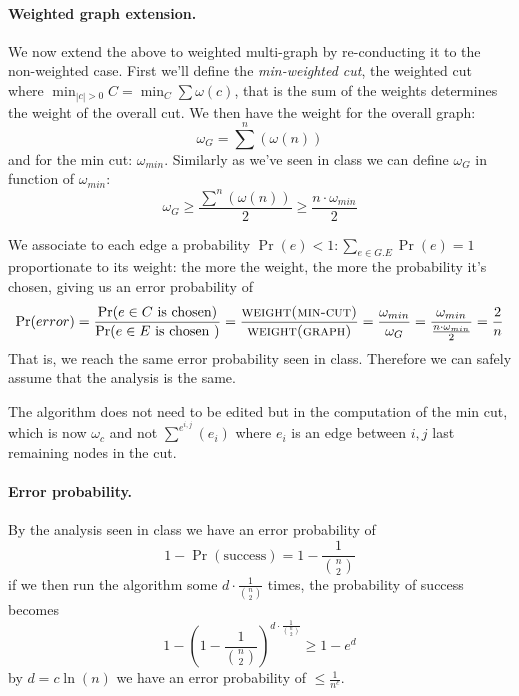 \paragraph{Weighted graph extension.}
We now extend the above to weighted multi-graph by re-conducting it to the non-weighted case.
First we'll define the \emph{min-weighted cut}, the weighted cut where $\min_{|c| > 0} C = \min_{C} \sum{\omega(c)}$, that is the sum of the weights determines the weight of the overall cut.
We then have the weight for the overall graph: 
\begin{equation*}
\omega_G = \sum^{n}\left( \omega(n) \right)
\end{equation*}
and for the min cut: $\omega_{min}$.
Similarly as we've seen in class we can define $\omega_G$ in function of $\omega_{min}$:
\begin{equation*}
\omega_G \geq \frac{\sum^{n} \left( \omega(n) \right)}{2} \geq \frac{n \cdot \omega_{min}}{2}
\end{equation*}

We associate to each edge a probability $\Pr(e) < 1: \sum_{e \in G.E} \Pr(e)= 1$ proportionate to its weight: the more the weight, the more the probability it's chosen, giving us an error probability of
\begin{equation*}
\Pr(error) = \frac{\Pr(e \in C \text{ is chosen})}{\Pr(e \in E \text{ is chosen })} = \frac{\textsc{weight(min-cut)}}{\textsc{weight(graph)}} = \frac{\omega_{min}}{\omega_G} = \frac{\omega_{min}}{\frac{n \cdot \omega_{min}}{2}} = \frac{2}{n}
\end{equation*}
That is, we reach the same error probability seen in class.
Therefore we can safely assume that the analysis is the same.

The algorithm does not need to be edited but in the computation of the min cut, which is now $\omega_c$ and not $\sum^{e^{i, j}} \left( e_i \right)$ where $e_i$ is an edge between $i, j$ last remaining nodes in the cut.

\paragraph{Error probability.}
By the analysis seen in class we have an error probability of
\begin{equation*}
1 - \Pr({\text{success}}) = 1 - \frac{1}{{{n} \choose {2}}}
\end{equation*}
if we then run the algorithm some $d \cdot \frac{1}{{{n} \choose {2}}}$ times, the probability of success becomes
\begin{equation*}
1 - \left(1 - \frac{1}{{{n} \choose {2}}} \right)^{d \cdot \frac{1}{{{n} \choose {2}}}} \geq 1 - e^{d}
\end{equation*}
by $d = c \ln(n)$ we have an error probability of $\leq \frac{1}{n^c}$.